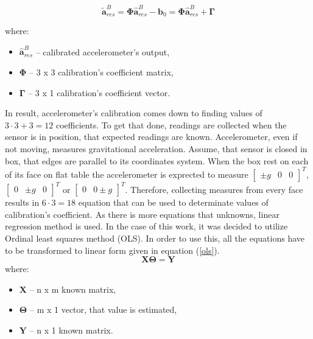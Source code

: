 \begin{equation}
	\bm{\tilde{a}}_{res}^B = \bm{\Phi} \bm{\hat{a}}_{res}^B - \bm{b}_0 = \bm{\Phi} \bm{\hat{a}}_{res}^B + \bm{\Gamma}
	\label{acc_calib2}
\end{equation}

where:
\begin{itemize}
	\item $\bm{\hat{a}}_{res}^B$ -- calibrated accelerometer's output,
	\item $\bm{\Phi}$ -- 3 x 3 calibration's coefficient matrix,
	\item $\bm{\Gamma}$ -- 3 x 1 calibration's coefficient vector.
\end{itemize}

In result, accelerometer's calibration comes down to finding values of $3 \cdot 3 + 3 = 12$ coefficients. To get that done, readings are collected when the sensor is in position, that expected readings are known. Accelerometer, even if not moving, measures gravitational acceleration. Assume, that sensor is closed in box, that edges are parallel to its coordinates system. When the box rest on each of its face on flat table the accelerometer is exprected to measure $\begin{bmatrix}\pm g & 0 & 0\end{bmatrix}^T$, $\begin{bmatrix}0 & \pm g & 0\end{bmatrix}^T$ or $\begin{bmatrix} 0 & 0 \pm g\end{bmatrix}^T$. Therefore, collecting measures from every face results in $6 \cdot 3 = 18$ equation that can be used to determinate values of calibration's coefficient. As there is more equations that unknowns, linear regression method is used. In the case of this work, it was decided to utilize Ordinal least squares method (OLS). In order to use this, all the equations have to be transformed to linear form given in equation (\ref{ols}).
\begin{equation}
	\bm{X} \bm{\Theta} = \bm{Y}
	\label{ols}
\end{equation}
where:
\begin{itemize}
	\item $\bm{X}$ -- n x m known matrix,
	\item $\bm{\Theta}$ -- m x 1 vector, that value is estimated,
	\item $\bm{Y}$ -- n x 1 known matrix.
\end{itemize}
 
